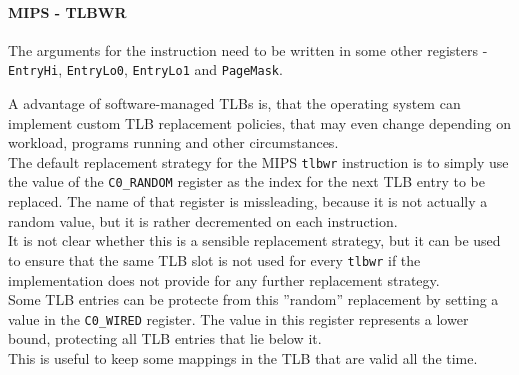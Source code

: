 \paragraph{MIPS - TLBWR} The arguments for the instruction need to be written in some
other registers - \texttt{EntryHi}, \texttt{EntryLo0}, \texttt{EntryLo1} and \texttt{PageMask}.








A advantage of software-managed TLBs is, that the operating system can implement custom
TLB replacement policies, that may even change depending on workload, programs running
and other circumstances.\\
The default replacement strategy for the MIPS \texttt{tlbwr} instruction is to simply
use the value of the \texttt{C0\_RANDOM} register as the index for the next TLB entry
to be replaced. The name of that register is missleading, because it is not actually a
random value, but it is rather decremented on each instruction\cite{heiserAnatomyHighPerformanceMicrokernel}.\\
It is not clear whether this is a sensible replacement strategy,
but it can be used to ensure that the same TLB slot is not used for every \texttt{tlbwr} if the implementation
does not provide for any further replacement strategy.\\
Some TLB entries can be protecte from this ''random'' replacement by setting a value in the \texttt{C0\_WIRED}
register. The value in this register represents a lower bound, protecting all TLB entries that lie below it.\\
This is useful to keep some mappings in the TLB that are valid all the time.

